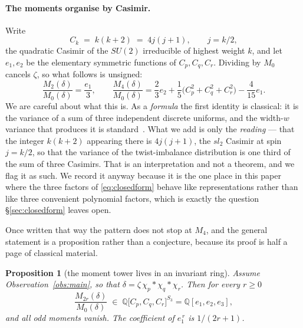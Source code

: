 \documentclass[11pt,a4paper]{article}
\newtheorem{proposition}{Proposition}
\begin{document}
\paragraph{The moments organise by Casimir.} Write
\[
C_k \;=\; k(k+2)\;=\;4j(j+1),\qquad j=k/2,
\]
the quadratic Casimir of the $SU(2)$ irreducible of highest weight $k$, and let $e_1,e_2$ be
the elementary symmetric functions of $C_p,C_q,C_r$. Dividing by $M_0$ cancels $\zeta$, so what
follows is unsigned:
\begin{equation}\label{eq:casimir}
\boxed{\;
\frac{M_2(\delta)}{M_0(\delta)}=\frac{e_1}{3},
\qquad
\frac{M_4(\delta)}{M_0(\delta)}=\frac{2}{3}e_2+\frac{1}{5}\big(C_p^2+C_q^2+C_r^2\big)
-\frac{4}{15}e_1 .\;}
\end{equation}
We are careful about what this is. As a \emph{formula} the first identity is classical: it is
the variance of a sum of three independent discrete uniforms, and the width-$w$ variance that
produces it is standard~\cite{Neuschel}. What we add is only the \emph{reading} --- that the
integer $k(k+2)$ appearing there is $4j(j+1)$, the $sl_2$ Casimir at spin $j=k/2$, so that the
variance of the twist-imbalance distribution is one third of the sum of three Casimirs. That is
an interpretation and not a theorem, and we flag it as such. We record it anyway because it is
the one place in this paper where the three factors of \eqref{eq:closedform} behave like
representations rather than like three convenient polynomial factors, which is exactly the
question \S\ref{sec:closedform} leaves open.

Once written that way the pattern does not stop at $M_4$, and the general statement is a
proposition rather than a conjecture, because its proof is half a page of classical material.

\begin{proposition}[the moment tower lives in an invariant ring]\label{prop:ring}
Assume Observation~\ref{obs:main}, so that $\delta=\zeta\,\chi_p*\chi_q*\chi_r$. Then for every
$r\ge0$
\[
\frac{M_{2r}(\delta)}{M_0(\delta)}\;\in\;
\mathbb{Q}\big[C_p,C_q,C_r\big]^{S_3}=\mathbb{Q}[e_1,e_2,e_3],
\]
and all odd moments vanish. The coefficient of $e_1^{\,r}$ is $1/(2r+1)$.
\end{proposition}
\end{document}
